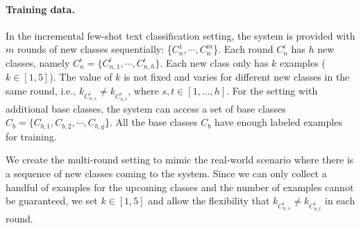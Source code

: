 \documentclass[11pt]{article}
\newcommand{\intentdata}{\textsc{IFS-Intent}}
\newcommand{\relationdata}{\textsc{IFS-Relation}}
\begin{document}
\paragraph{Training data.} In the incremental few-shot text classification setting, the system is provided with $m$ rounds of new classes sequentially: \{$C_n^1, \cdots, C_n^m$\}. Each round $C_n^i$ has $h$ new classes, namely $C_n^i=\{C^i_{n,1}, \cdots, C^i_{n,h}\}$. Each new class only has $k$ examples ($k\in [1,5]$). The value of $k$ is not fixed and varies for different new classes in the same round, i.e., $k_{C^i_{n,s}}\neq k_{C^i_{n,t}}$, where $s, t \in [1, ..., h]$. For the setting with additional base classes, the system can access a set of base classes $C_b=\{C_{b,1}, C_{b,2},\cdots, C_{b,g}\}$. All the base classes $C_{b}$ have enough labeled examples for training. 

We create the multi-round setting to mimic the real-world scenario where there is a sequence of new classes coming to the system. 
Since we can only collect a handful of examples for the upcoming classes and the number of examples cannot be guaranteed, we set $k\in [1,5]$ and allow the flexibility that $k_{C^i_{n,s}}\neq k_{C^i_{n,t}}$ in each round.






\end{document}
